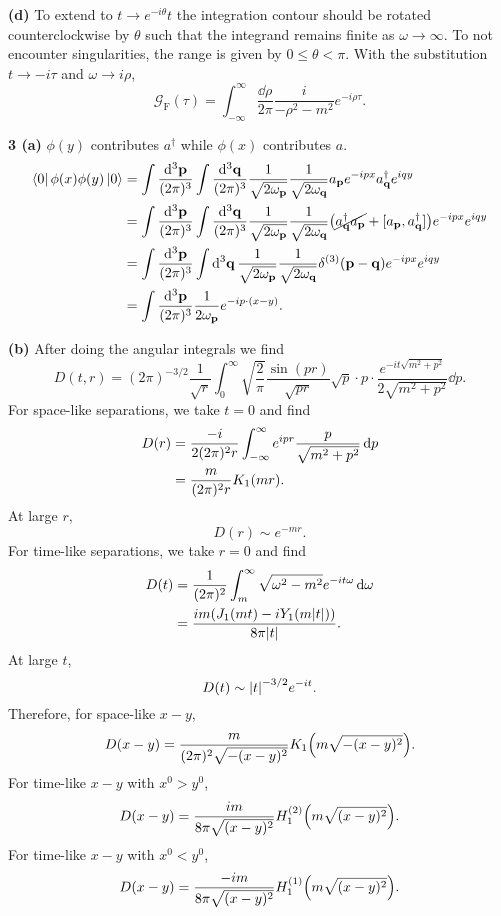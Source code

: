 \documentclass{article}
\makeatletter
\newcommand*{\shifttext}[1]{%
  \settowidth{\@tempdima}{#1}%
  \hspace{-\@tempdima}#1%
}
\newcommand{\plabel}[1]{%
\shifttext{\textbf{#1}\quad}%
}
\newcommand{\prule}{%
\begin{center}%
\hdashrule[0.5ex]{.99\linewidth}{1pt}{1pt 2.5pt}%
\end{center}%
}
\makeatother
\begin{document}
\plabel{(d)}%
To extend to $t \rightarrow e^{-i\theta}t$ the integration contour should be rotated counterclockwise by $\theta$ such that the integrand remains finite as $\omega \rightarrow \infty$.
To not encounter singularities, the range is given by $0\le \theta < \pi$.
With the substitution $t \rightarrow -i\tau$ and $\omega \rightarrow i \rho$,
\[ \mathcal{G}_{\mathrm{F}}(\tau) = \int_{-\infty}^\infty \frac{\dd{\rho}}{2\pi} \frac{i}{-\rho^2 - m^2} e^{-i\rho \tau}. \]

\prule
\plabel{3 (a)}%
$\phi(y)$ contributes $a^\dagger$ while $\phi(x)$ contributes $a$.
\begin{align}
    \notag \bra{0} \phi(x) \phi(y) \ket{0} &= \int \frac{\dd{^3\vb{p}}}{(2\pi)^3} \int \frac{\dd{^3\vb{q}}}{(2\pi)^3} \frac{1}{\sqrt{2\omega_{\vb{p}}}}\frac{1}{\sqrt{2\omega_{\vb{q}}}} a_{\vb{p}} e^{-ipx} a^\dagger_{\vb{q}} e^{iqy} \\
    \notag &= \int \frac{\dd{^3\vb{p}}}{(2\pi)^3} \int \frac{\dd{^3\vb{q}}}{(2\pi)^3} \frac{1}{\sqrt{2\omega_{\vb{p}}}}\frac{1}{\sqrt{2\omega_{\vb{q}}}} \qty(\cancel{a^\dagger_{\vb{q}}a_{\vb{p}}} + [a_{\vb{p}},a^\dagger_{\vb{q}}]) e^{-ipx} e^{iqy} \\
    \notag &= \int \frac{\dd{^3\vb{p}}}{(2\pi)^3} \int \dd{^3\vb{q}} \frac{1}{\sqrt{2\omega_{\vb{p}}}}\frac{1}{\sqrt{2\omega_{\vb{q}}}} \delta^{(3)}(\vb{p}-\vb{q}) e^{-ipx} e^{iqy} \\
    \label{eq:phiphi} &= \int \frac{\dd{^3\vb{p}}}{(2\pi)^3} \frac{1}{2\omega_{\vb{p}}} e^{-ip\cdot (x-y)}.
\end{align}

\plabel{(b)}%
After doing the angular integrals we find
\[ D(t,r) = (2\pi)^{-3/2} \frac{1}{\sqrt{r}} \int_0^\infty \sqrt{\frac{2}{\pi}} \frac{\sin(pr)}{\sqrt{pr}} \sqrt{p}\cdot p \cdot \frac{e^{-it\sqrt{m^2+p^2}}}{2  \sqrt{m^2+p^2}}\dd{p}. \]
For space-like separations, we take $t=0$ and find
\begin{align}
    \notag D(r) &= \frac{-i}{2(2\pi)^2 r} \int_{-\infty}^\infty e^{ipr} \frac{p}{\sqrt{m^2+p^2}}\dd{p} \\
    \label{eq:space_like_d} &= \frac{m}{(2\pi)^2 r} K_1(mr).
\end{align}
At large $r$,
\[ D(r) \sim e^{-mr}. \]
For time-like separations, we take $r=0$ and find
\begin{align}
    \notag D(t) &= \frac{1}{(2\pi)^2} \int_m^\infty \sqrt{\omega^2 - m^2} e^{-it\omega} \dd{\omega} \\
    \label{eq:time_like_d} &= \frac{im(J_1(mt) - iY_1(m\abs{t}))}{8\pi \abs{t}}.
\end{align}
At large $t$,
\[ D(t) \sim \abs{t}^{-3/2} e^{-it}. \]
Therefore, for space-like $x-y$,
\[ D(x-y) = \frac{m}{(2\pi)^2 \sqrt{-(x-y)^2}} K_1\qty(m\sqrt{-(x-y)^2}). \]
For time-like $x-y$ with $x^0 > y^0$,
\[ D(x-y) = \frac{im}{8\pi \sqrt{(x-y)^2}} H^{(2)}_1\qty(m\sqrt{(x-y)^2}). \]
For time-like $x-y$ with $x^0 < y^0$,
\[ D(x-y) = \frac{-im}{8\pi \sqrt{(x-y)^2}} H^{(1)}_1\qty(m\sqrt{(x-y)^2}). \]
\end{document}

